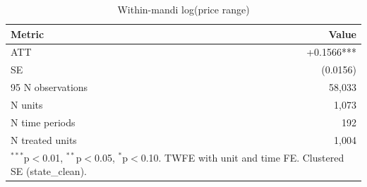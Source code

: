 \begin{table}[htbp]
\centering
\caption{Within-mandi log(price range)}
\label{tab:spec1_within_mandi_pooled}
\begin{tabular}{lr}
\hline\hline
Metric & Value \\
\hline
ATT & +0.1566*** \\
SE & (0.0156) \\
95%
N observations & 58,033 \\
N units & 1,073 \\
N time periods & 192 \\
N treated units & 1,004 \\
\hline\hline
\multicolumn{2}{l}{\footnotesize $^{***}$p$<$0.01, $^{**}$p$<$0.05, $^{*}$p$<$0.10. TWFE with unit and time FE. Clustered SE (state_clean).} \\
\end{tabular}
\end{table}